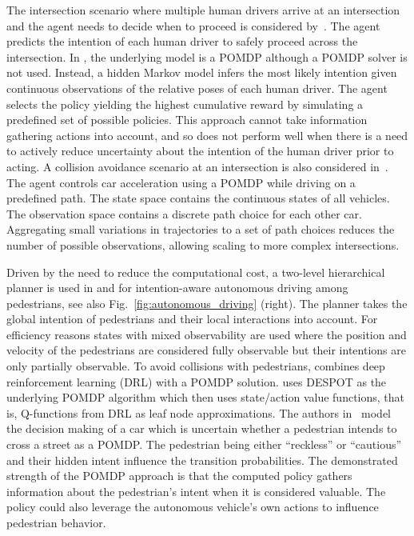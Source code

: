 \documentclass[journal]{IEEEtran}
\begin{document}
The intersection scenario where multiple human drivers arrive at an
intersection and the agent needs to decide when to proceed is considered by~\cite{song2016intention}.
The agent predicts the intention of each human driver {to safely proceed across the intersection}. In
\cite{song2016intention}, the underlying model is a POMDP although a
POMDP {solver is not used}.
Instead, a hidden Markov model {infers} the most likely
intention given continuous observations of the relative poses of each
human driver.
{The agent selects the policy yielding the highest cumulative reward by simulating a predefined set of possible policies.}
This approach cannot take information gathering actions
into account{, and so does not perform well when there is a need to actively reduce uncertainty about the intention of the human driver prior to acting.}
A collision avoidance scenario at an intersection is also considered in~\cite{hubmann2017decision}.
The agent controls car
acceleration using a POMDP while driving on a predefined path. The
state space contains the continuous states of all vehicles. The
observation space contains {a discrete path choice for each other car}.
{Aggregating small variations in trajectories to a set of path choices reduces the number of possible observations, allowing scaling to more complex intersections.}

Driven by the need to reduce the computational cost, a two-level hierarchical
planner is used in \cite{luo2018autonomous} and
\cite{bai2015intention} for intention-aware autonomous driving among pedestrians, see also Fig.~\ref{fig:autonomous_driving} (right).
%
%
The
planner takes the global intention of pedestrians and their local
interactions into account. For efficiency reasons states with mixed
observability are used where the position and velocity
of the pedestrians are considered fully observable but their
intentions are only partially observable. To avoid collisions with
pedestrians, \cite{pusse2019hybrid} combines deep reinforcement
learning (DRL) with a POMDP solution. \cite{pusse2019hybrid} uses
DESPOT as the underlying POMDP algorithm which then uses state/action
value functions, that is, Q-functions from DRL as leaf node
approximations. {The authors in}~\cite{ychsu2020} model the decision making
of a car which is uncertain whether a pedestrian intends to cross a
street as a POMDP. The pedestrian being either ``reckless'' or ``cautious'' and
their hidden intent influence the transition probabilities.
%
%
%
{The demonstrated strength of the POMDP approach is that the computed policy gathers information about the pedestrian's intent when it is considered valuable.
The policy could also leverage the autonomous vehicle's own actions to influence pedestrian behavior.
}
\end{document}
